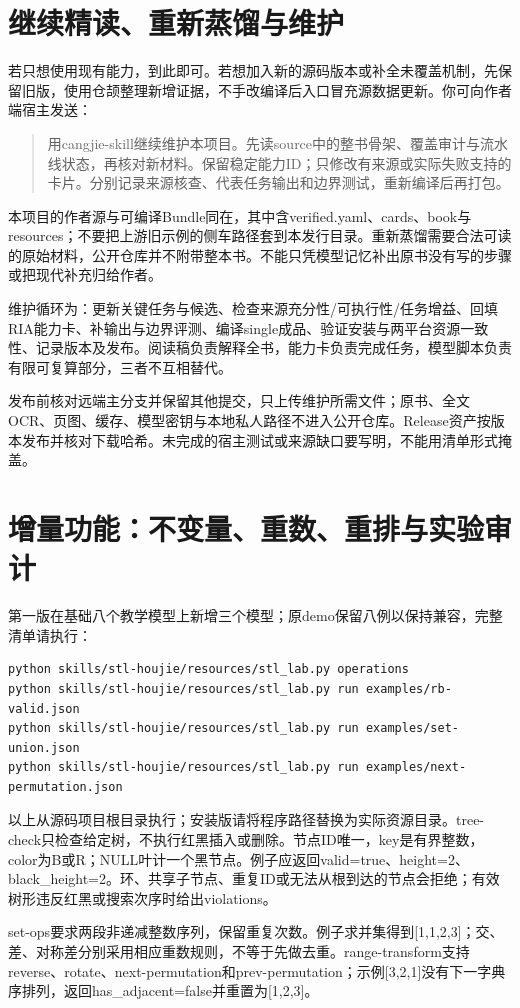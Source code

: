 \documentclass[11pt,a4paper,fontset=fandol]{ctexart}
\begin{document}
\section{继续精读、重新蒸馏与维护}
若只想使用现有能力，到此即可。若想加入新的源码版本或补全未覆盖机制，先保留旧版，使用仓颉整理新增证据，不手改编译后入口冒充源数据更新。你可向作者端宿主发送：
\begin{quote}
用cangjie-skill继续维护本项目。先读source中的整书骨架、覆盖审计与流水线状态，再核对新材料。保留稳定能力ID；只修改有来源或实际失败支持的卡片。分别记录来源核查、代表任务输出和边界测试，重新编译后再打包。
\end{quote}
本项目的作者源与可编译Bundle同在，其中含verified.yaml、cards、book与resources；不要把上游旧示例的侧车路径套到本发行目录。重新蒸馏需要合法可读的原始材料，公开仓库并不附带整本书。不能只凭模型记忆补出原书没有写的步骤或把现代补充归给作者。

维护循环为：更新关键任务与候选、检查来源充分性/可执行性/任务增益、回填RIA能力卡、补输出与边界评测、编译single成品、验证安装与两平台资源一致性、记录版本及发布。阅读稿负责解释全书，能力卡负责完成任务，模型脚本负责有限可复算部分，三者不互相替代。

发布前核对远端主分支并保留其他提交，只上传维护所需文件；原书、全文OCR、页图、缓存、模型密钥与本地私人路径不进入公开仓库。Release资产按版本发布并核对下载哈希。未完成的宿主测试或来源缺口要写明，不能用清单形式掩盖。


\section{增量功能：不变量、重数、重排与实验审计}
第一版在基础八个教学模型上新增三个模型；原demo保留八例以保持兼容，完整清单请执行：
\begin{lstlisting}
python skills/stl-houjie/resources/stl_lab.py operations
python skills/stl-houjie/resources/stl_lab.py run examples/rb-valid.json
python skills/stl-houjie/resources/stl_lab.py run examples/set-union.json
python skills/stl-houjie/resources/stl_lab.py run examples/next-permutation.json
\end{lstlisting}
以上从源码项目根目录执行；安装版请将程序路径替换为实际资源目录。tree-check只检查给定树，不执行红黑插入或删除。节点ID唯一，key是有界整数，color为B或R；NULL叶计一个黑节点。例子应返回valid=true、height=2、black\_height=2。环、共享子节点、重复ID或无法从根到达的节点会拒绝；有效树形违反红黑或搜索次序时给出violations。

set-ops要求两段非递减整数序列，保留重复次数。例子求并集得到[1,1,2,3]；交、差、对称差分别采用相应重数规则，不等于先做去重。range-transform支持reverse、rotate、next-permutation和prev-permutation；示例[3,2,1]没有下一字典序排列，返回has\_adjacent=false并重置为[1,2,3]。
\end{document}
